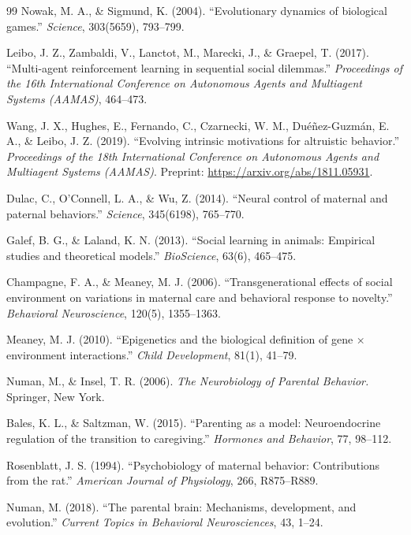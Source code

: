 \begin{thebibliography}{99}
Nowak, M. A., \& Sigmund, K. (2004).
``Evolutionary dynamics of biological games.''
\textit{Science}, 303(5659), 793–799.

Leibo, J. Z., Zambaldi, V., Lanctot, M., Marecki, J., \& Graepel, T. (2017).
``Multi-agent reinforcement learning in sequential social dilemmas.''
\textit{Proceedings of the 16th International Conference on Autonomous Agents and Multiagent Systems (AAMAS)}, 464–473.

Wang, J. X., Hughes, E., Fernando, C., Czarnecki, W. M., Duéñez-Guzmán, E. A., \& Leibo, J. Z. (2019).
``Evolving intrinsic motivations for altruistic behavior.''
\textit{Proceedings of the 18th International Conference on Autonomous Agents and Multiagent Systems (AAMAS)}.
Preprint: \url{https://arxiv.org/abs/1811.05931}.


Dulac, C., O'Connell, L. A., \& Wu, Z. (2014).
``Neural control of maternal and paternal behaviors.''
\textit{Science}, 345(6198), 765–770.

Galef, B. G., \& Laland, K. N. (2013).
``Social learning in animals: Empirical studies and theoretical models.''
\textit{BioScience}, 63(6), 465–475.

Champagne, F. A., \& Meaney, M. J. (2006).
``Transgenerational effects of social environment on variations in maternal care and behavioral response to novelty.''
\textit{Behavioral Neuroscience}, 120(5), 1355–1363.

Meaney, M. J. (2010).
``Epigenetics and the biological definition of gene × environment interactions.''
\textit{Child Development}, 81(1), 41–79.

Numan, M., \& Insel, T. R. (2006).
\textit{The Neurobiology of Parental Behavior.}
Springer, New York.

Bales, K. L., \& Saltzman, W. (2015).
``Parenting as a model: Neuroendocrine regulation of the transition to caregiving.''
\textit{Hormones and Behavior}, 77, 98–112.

Rosenblatt, J. S. (1994).
``Psychobiology of maternal behavior: Contributions from the rat.''
\textit{American Journal of Physiology}, 266, R875–R889.

Numan, M. (2018).
``The parental brain: Mechanisms, development, and evolution.''
\textit{Current Topics in Behavioral Neurosciences}, 43, 1–24.



\end{thebibliography}
